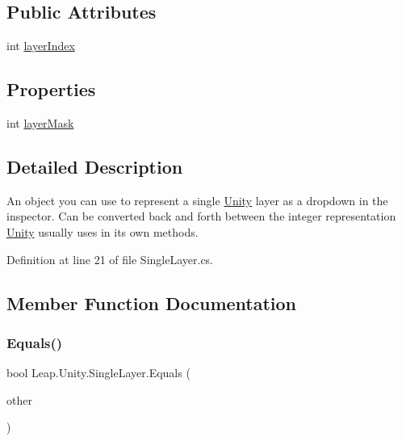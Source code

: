 \subsection*{Public Attributes}
\begin{DoxyCompactItemize}
\item 
int \mbox{\hyperlink{struct_leap_1_1_unity_1_1_single_layer_a5e955c6fd2ba1991b97b333e176f005b}{layer\+Index}}
\end{DoxyCompactItemize}
\subsection*{Properties}
\begin{DoxyCompactItemize}
\item 
int \mbox{\hyperlink{struct_leap_1_1_unity_1_1_single_layer_a7679475c49c9314d9849150b8bc84e70}{layer\+Mask}}
\end{DoxyCompactItemize}


\subsection{Detailed Description}
An object you can use to represent a single \mbox{\hyperlink{namespace_leap_1_1_unity}{Unity}} layer as a dropdown in the inspector. Can be converted back and forth between the integer representation \mbox{\hyperlink{namespace_leap_1_1_unity}{Unity}} usually uses in its own methods. 



Definition at line 21 of file Single\+Layer.\+cs.



\subsection{Member Function Documentation}
\mbox{\label{struct_leap_1_1_unity_1_1_single_layer_ae66a15ea93a27bce3c4ed9d776e23b86}} 
\subsubsection{\texorpdfstring{Equals()}{Equals()}}
{\footnotesize\ttfamily bool Leap.\+Unity.\+Single\+Layer.\+Equals (\begin{DoxyParamCaption}\item[{\mbox{\hyperlink{struct_leap_1_1_unity_1_1_single_layer}{Single\+Layer}}}]{other }\end{DoxyParamCaption})}



